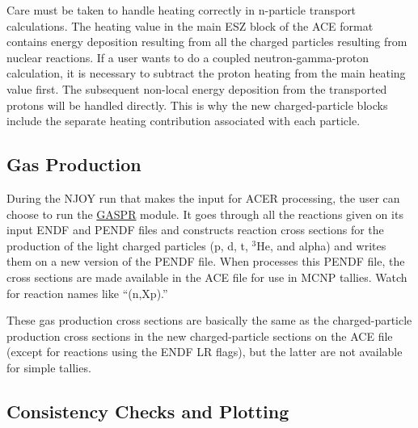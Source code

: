 Care must be taken to handle heating correctly in n-particle
transport calculations.  The heating value in the main ESZ block of
the ACE format contains energy deposition resulting from all the
charged particles resulting from nuclear reactions.  If a user
wants to do a coupled neutron-gamma-proton calculation, it is
necessary to subtract the proton heating from the main heating
value first.  The subsequent non-local energy deposition from the
transported protons will be handled directly.  This is why the
new charged-particle blocks include the separate heating contribution
associated with each particle.

\subsection{Gas Production}
\label{ssACER_gasprod}

During the NJOY run that makes the input for ACER processing, the user
can choose to run the \hyperlink{sGASPRhy}{GASPR} module.  It goes
through all the reactions given on its input ENDF and PENDF files and
constructs reaction cross sections for the production of the
light charged particles (p, d, t, $^{3}$He, and alpha) and
writes them on a new version of the PENDF file.  When
 processes this PENDF file, the cross sections are
made available in the ACE file for use in MCNP tallies.  Watch for
reaction names like ``(n,Xp).''

These gas production cross sections are basically the same as the
charged-particle production cross sections in the new charged-particle
sections on the ACE file (except for reactions using the ENDF LR flags),
but the latter are not available for simple tallies.

\subsection{Consistency Checks and Plotting}
\label{ssACER_chk}

